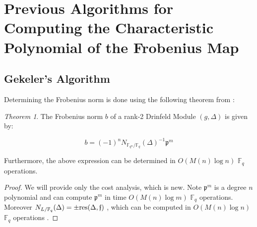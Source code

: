 \documentclass{acmart}
\theoremstyle{remark}
\numberwithin{equation}{section}
\newtheorem{theorem}{Theorem}
\newcommand{\frakf}{\mathfrak{f}}
\begin{document}


\section{Previous Algorithms for Computing the Characteristic Polynomial of the Frobenius Map}

\subsection{Gekeler's Algorithm}

 Determining the Frobenius norm is done using the following theorem from \cite{frobdist}:

\begin{theorem}\label{frobnorm}
The Frobenius norm $b$ of a rank-2 Drinfeld Module $(g,\Delta)$ is given by:

\[b = (-1)^n N_{\mathbb{F}_{q^n}/\mathbb{F}_q}(\Delta)^{-1}\mathfrak{p}^m\]

Furthermore, the above expression can be determined in $O(M(n)\log n)$ $\mathbb{F}_q$ operations.

\end{theorem}

\begin{proof}
We will provide only the cost analysis, which is new. Note $\mathfrak{p}^m$  is a degree $n$ polynomial and can compute $\mathfrak{p}^m$ in time $O(M(n) \log m)$ $\mathbb{F}_q$ operations. Moreover $N_{L/\mathbb{F}_q}(\Delta) = \pm \textnormal{res}(\Delta,\frakf)$ \cite{Pohst:1989:AAN:76692}, which can be computed in $O(M(n)\log n)$ $\mathbb{F}_q$ operations \cite{Pohst:1989:AAN:76692}.
\end{proof}
\end{document}
